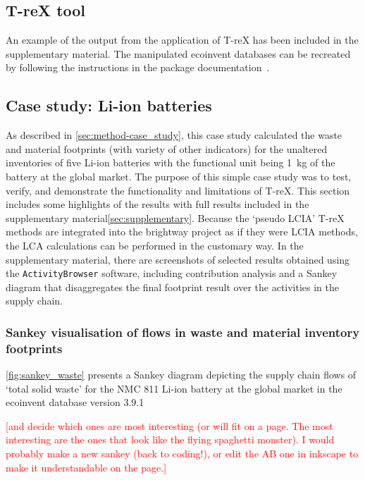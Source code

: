 \subsection{T-reX tool}\label{sec:results-T-reX}

An example of the output from the application of T-reX has been included in the supplementary material. The manipulated ecoinvent databases can be recreated by following the instructions in the package documentation~\citep{mcdowall2023T-reXdocs}.

\subsection{Case study: Li-ion batteries}\label{sec:results-case_study}

As described in \autoref{sec:method-case_study}, this case study calculated the waste and material footprints (with variety of other indicators) for the unaltered inventories of five Li-ion batteries with the functional unit being 1~kg of the battery at the global market. The purpose of this simple case study was to test, verify, and demonstrate the functionality and limitations of T-reX. This section includes some highlights of the results with full results included in the supplementary material\autoref{sec:supplementary}. Because the `pseudo LCIA' T-reX methods are integrated into the brightway project as if they were LCIA methods, the LCA calculations can be performed in the customary way. In the supplementary material, there are screenshots of selected results obtained using the \texttt{ActivityBrowser} software, including contribution analysis and a Sankey diagram that disaggregates the final footprint result over the activities in the supply chain.

\subsubsection{Sankey visualisation of flows in waste and material inventory footprints}\label{sec:results-case_study-sankey}


\autoref{fig:sankey_waste} presents a Sankey diagram depicting the supply chain flows of `total solid waste' for the NMC 811 Li-ion battery at the global market in the ecoinvent database version 3.9.1


\textcolor{red}{[and decide which ones are most interesting (or will fit on a page. The most interesting are the ones that look like the flying spaghetti monster). I would probably make a new sankey (back to coding!), or edit the AB one in inkscape to make it understandable on the page.]}

